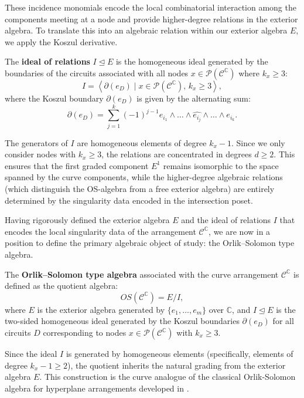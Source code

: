 \documentclass[article,11pt]{amsart} \numberwithin{equation}{section}
\numberwithin{equation}{section}
\begin{document}
{These incidence monomials encode the local combinatorial interaction among the components meeting at a node and provide higher-degree relations in the exterior algebra. To translate this into an algebraic relation within our exterior algebra $E$, we apply the Koszul derivative.

\begin{df}\label{def:os_ideal}
	The \textbf{ideal of relations} $I \unlhd E$ is the homogeneous ideal generated by the boundaries of the circuits associated with all nodes $x \in \mathcal{P}(\mathcal{C}^\mathbb{C})$ where $k_x \ge 3$:
	\[ I = \left\langle \partial(e_D) \mid x \in \mathcal{P}(\mathcal{C}^\mathbb{C}), \, k_x \ge 3 \right\rangle, \]
	where the Koszul boundary $\partial(e_D)$ is given by the alternating sum:
	\[ \partial(e_D) = \sum_{j=1}^k (-1)^{j-1} e_{i_1} \wedge \dots \wedge \widehat{e_{i_j}} \wedge \dots \wedge e_{i_k}. \]
\end{df}

\begin{rk}
	The generators of $I$ are homogeneous elements of degree $k_x - 1$. Since we only consider nodes with $k_x \ge 3$, the relations are concentrated in degrees $d \ge 2$. This ensures that the first graded component $E^1$ remains isomorphic to the space spanned by the curve components, while the higher-degree algebraic relations (which distinguish the OS-algebra from a free exterior algebra) are entirely determined by the singularity data encoded in the intersection poset.
\end{rk}

Having rigorously defined the exterior algebra $E$ and the ideal of relations $I$ that encodes the local singularity data of the arrangement $\mathcal{C}^\mathbb{C}$, we are now in a position to define the primary algebraic object of study: the Orlik–Solomon type algebra.

\begin{df}
	The \textbf{Orlik–Solomon type algebra} associated with the curve arrangement $\mathcal{C}^\mathbb{C}$ is defined as the quotient algebra:
	\[ OS(\mathcal{C}^\mathbb{C}) = E / I, \]
	where $E$ is the exterior algebra generated by $\{e_1, \dots, e_m\}$ over $\mathbb{C}$, and $I \unlhd E$ is the two-sided homogeneous ideal generated by the Koszul boundaries $\partial(e_D)$ for all circuits $D$ corresponding to nodes $x \in \mathcal{P}(\mathcal{C}^\mathbb{C})$ with $k_x \ge 3$.
\end{df}

Since the ideal $I$ is generated by homogeneous elements (specifically, elements of degree $k_x - 1 \ge 2$), the quotient inherits the natural grading from the exterior algebra $E$. This construction is the curve analogue of the classical Orlik-Solomon algebra for hyperplane arrangements developed in \cite{OrlikTerao}.

}
\end{document}
